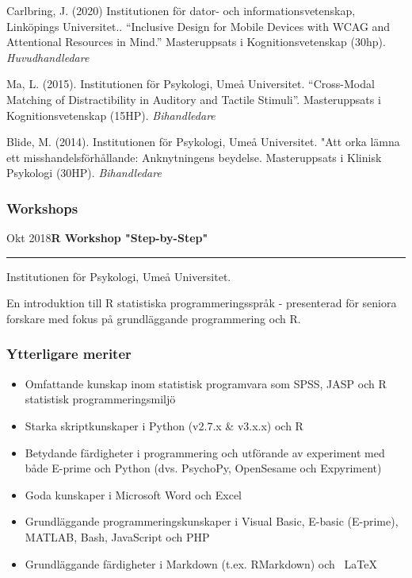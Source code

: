 \documentclass[]{article}
\providecommand{\tightlist}{%
  \setlength{\itemsep}{0pt}\setlength{\parskip}{0pt}}
\begin{document}
Carlbring, J. (2020) Institutionen för dator- och informationsvetenskap,
Linköpings Universitet.. ``Inclusive Design for Mobile Devices with WCAG
and Attentional Resources in Mind.'' Masteruppsats i Kognitionsvetenskap
(30hp). \emph{Huvudhandledare}

Ma, L. (2015). Institutionen för Psykologi, Umeå Universitet.
``Cross-Modal Matching of Distractibility in Auditory and Tactile
Stimuli''. Masteruppsats i Kognitionsvetenskap (15HP).
\emph{Bihandledare}

Blide, M. (2014). Institutionen för Psykologi, Umeå Universitet. "Att
orka lämna ett misshandelsförhållande: Anknytningens beydelse.
Masteruppsats i Klinisk Psykologi (30HP). \emph{Bihandledare}

\hypertarget{workshops}{%
\subsubsection{Workshops}\label{workshops}}

Okt 2018\hspace{0.75cm}\textbf{R Workshop "Step-by-Step"}\vspace{1mm}

\hrule
\begin{changemargin}{2.15cm}{2.4cm}


Institutionen för Psykologi, Umeå Universitet.

En introduktion till R statistiska programmeringsspråk - presenterad för seniora forskare med fokus på grundläggande programmering och R.

\end{changemargin}

\hypertarget{ytterligare-meriter}{%
\subsubsection{Ytterligare meriter}\label{ytterligare-meriter}}

\begin{itemize}
\tightlist
\item
  Omfattande kunskap inom statistisk programvara som SPSS, JASP och R
  statistisk programmeringsmiljö
\item
  Starka skriptkunskaper i Python (v2.7.x \& v3.x.x) och R
\item
  Betydande färdigheter i programmering och utförande av experiment med
  både E-prime och Python (dvs. PsychoPy, OpenSesame och Expyriment)
\item
  Goda kunskaper i Microsoft Word och Excel
\item
  Grundläggande programmeringskunskaper i Visual Basic, E-basic
  (E-prime), MATLAB, Bash, JavaScript och PHP
\item
  Grundläggande färdigheter i Markdown (t.ex. RMarkdown) och ~LaTeX
\end{itemize}
\end{document}
